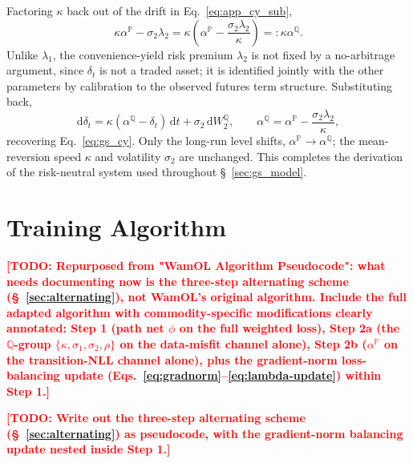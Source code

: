 \documentclass[11pt, a4paper]{article}
\newcommand{\todo}[1]{\textcolor{red}{\textbf{[TODO: #1]}}}
\newcommand{\convyield}{\delta}             %
\newcommand{\meanrev}{\kappa}               %
\newcommand{\longrun}{\alpha}               %
\begin{document}
Factoring $\meanrev$ back out of the drift in Eq.~\ref{eq:app_cy_sub},
\begin{equation}
  \label{eq:app_alphaQ}
  \meanrev\longrun^{\mathbb{P}} - \sigma_2\lambda_2
  = \meanrev\!\left(\longrun^{\mathbb{P}} - \frac{\sigma_2\lambda_2}{\meanrev}\right)
  =: \meanrev\longrun^{\mathbb{Q}}.
\end{equation}
\noindent
Unlike $\lambda_1$, the convenience-yield risk premium $\lambda_2$ is not fixed by a no-arbitrage argument, since $\convyield_t$ is not a traded asset; it is identified jointly with the other parameters by calibration to the observed futures term structure. Substituting back,
\begin{equation}
  \label{eq:app_cy_Q}
  \mathrm{d}\convyield_t = \meanrev(\longrun^{\mathbb{Q}} - \convyield_t)\,\mathrm{d}t + \sigma_2\,\mathrm{d}W_2^{\mathbb{Q}},
  \qquad
  \longrun^{\mathbb{Q}} = \longrun^{\mathbb{P}} - \frac{\sigma_2\lambda_2}{\meanrev},
\end{equation}
\noindent
recovering Eq.~\ref{eq:gs_cy}. Only the long-run level shifts, $\longrun^{\mathbb{P}} \to \longrun^{\mathbb{Q}}$; the mean-reversion speed $\meanrev$ and volatility $\sigma_2$ are unchanged. This completes the derivation of the risk-neutral system used throughout \S~\ref{sec:gs_model}.

\section{Training Algorithm}
\label{app:algorithm}

\todo{Repurposed from "WamOL Algorithm Pseudocode": what needs documenting now
  is the three-step alternating scheme (\S~\ref{sec:alternating}), not
  WamOL's original algorithm. Include the full adapted algorithm with
  commodity-specific modifications clearly annotated: Step 1 (path net $\phi$
  on the full weighted loss), Step 2a (the $\mathbb{Q}$-group
  $\{\kappa,\sigma_1,\sigma_2,\rho\}$ on the data-misfit channel alone), Step 2b
  ($\alpha^{\mathbb{P}}$ on the transition-NLL channel alone), plus the
  gradient-norm loss-balancing update (Eqs.~\ref{eq:gradnorm}--\ref{eq:lambda-update})
  within Step 1.}

\begin{algorithm}[H]
\caption{Alternating Optimisation for Gibson--Schwartz Convenience Yield Estimation}
\label{alg:wamol_gs}
\todo{Write out the three-step alternating scheme (\S~\ref{sec:alternating})
  as pseudocode, with the gradient-norm balancing update nested inside Step 1.}
\end{algorithm}
\end{document}
